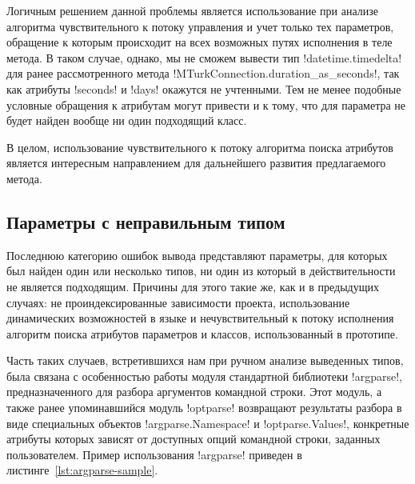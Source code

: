 Логичным решением данной проблемы является использование при анализе алгоритма
чувствительного к потоку управления и учет только тех параметров, обращение к
которым происходит на всех возможных путях исполнения в теле метода. В таком
случае, однако, мы не сможем вывести тип !datetime.timedelta! для ранее
рассмотренного метода !MTurkConnection.duration_as_seconds!, так как атрибуты
!seconds! и !days! окажутся не учтенными. Тем не менее подобные условные обращения
к атрибутам могут привести и к тому, что для параметра не будет найден вообще ни
один подходящий класс. 

В целом, использование чувствительного к потоку алгоритма поиска
атрибутов является интересным направлением для дальнейшего развития
предлагаемого метода.

\subsection{Параметры с неправильным типом}
\label{sub:unsound-incomplete}

Последнюю категорию ошибок вывода представляют параметры, для которых был найден
один или несколько типов, ни один из который в действительности не является
подходящим. Причины для этого такие же, как и в предыдущих случаях:
не проиндексированные зависимости проекта, использование динамических
возможностей в языке и нечувствительный к потоку исполнения алгоритм поиска
атрибутов параметров и классов, использованный в прототипе. 


Часть таких случаев, встретившихся нам при ручном анализе выведенных типов, была
связана с особенностью работы модуля стандартной библиотеки !argparse!,
предназначенного для разбора аргументов командной строки.
Этот модуль, а также ранее упоминавшийся модуль !optparse! возвращают результаты
разбора в виде специальных объектов !argparse.Namespace! и !optparse.Values!,
конкретные атрибуты которых зависят от доступных опций командной строки,
заданных пользователем. Пример использования !argparse! приведен в
листинге~\ref{lst:argparse-sample}.


